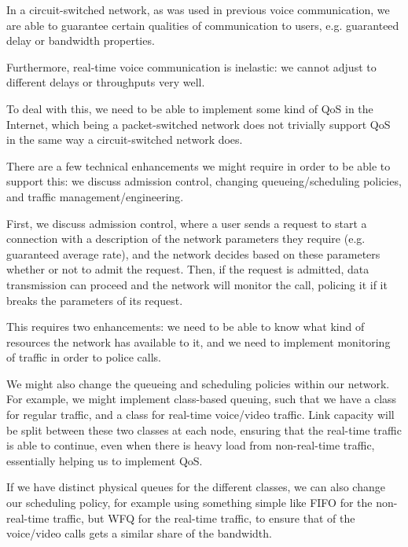 
\usepackage{parskip}


In a circuit-switched network, as was used in previous voice communication, we are able to guarantee certain qualities of communication to users, e.g. guaranteed delay or bandwidth properties.

Furthermore, real-time voice communication is inelastic: we cannot adjust to different delays or throughputs very well.

To deal with this, we need to be able to implement some kind of QoS in the Internet, which being a packet-switched network does not trivially support QoS in the same way a circuit-switched network does.

There are a few technical enhancements we might require in order to be able to support this: we discuss admission control, changing queueing/scheduling policies, and traffic management/engineering.

First, we discuss admission control, where a user sends a request to start a connection with a description of the network parameters they require (e.g. guaranteed average rate), and the network decides based on these parameters whether or not to admit the request. Then, if the request is admitted, data transmission can proceed and the network will monitor the call, policing it if it breaks the parameters of its request.

This requires two enhancements: we need to be able to know what kind of resources the network has available to it, and we need to implement monitoring of traffic in order to police calls.

\vspace{15pt}

We might also change the queueing and scheduling policies within our network. For example, we might implement class-based queuing, such that we have a class for regular traffic, and a class for real-time voice/video traffic. Link capacity will be split between these two classes at each node, ensuring that the real-time traffic is able to continue, even when there is heavy load from non-real-time traffic, essentially helping us to implement QoS.

If we have distinct physical queues for the different classes, we can also change our scheduling policy, for example using something simple like FIFO for the non-real-time traffic, but WFQ for the real-time traffic, to ensure that of the voice/video calls gets a similar share of the bandwidth.

\vspace{15pt}

